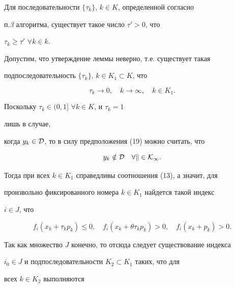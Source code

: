 \begin{lem}


Для последовательности $\{\tau_k\}$, $k\in K$, определенной согласно


п.{\em 3} алгоритма, существует такое число $\tau'>0$, что


$\tau_k\ge \tau'$ $\forall k\in k$.


\end{lem}





\begin{pf}


Допустим, что утверждение леммы неверно, т.е. существует такая


подпоследовательность $\{\tau_k\}$, $k\in K_1\subset K$, что


\begin{equation}


\tau_k\to 0,\quad k\to\infty,\quad k\in K_1.


\end{equation}


Поскольку $\tau_k\in(0,1]$ $\forall k\in K$, и $\tau_k=1$


лишь в случае,


когда $y_k\in\cal D$, то в силу предположения (19) можно считать, что


\begin{equation}


y_k\notin\cal D\quad \forall k\in K_1.


\end{equation}


Тогда при всех $k\in K_1$ справедливы соотношения (13), а значит, для


произвольно фиксированного номера $k\in K_1$ найдется такой индекс


$i\in J$, что


\begin{equation}


f_i(x_k+\tau_kp_k)\le 0,\quad


f_i(x_k+\theta\tau_kp_k)>0,\quad f_i(x_k+p_k)>0.


\end{equation}


Так как множество $J$ конечно, то отсюда следует существование индекса


$i_0\in J$ и подпоследовательности $K_2\subset K_1$ таких, что для


всех $k\in K_2$ выполняются



\end{pf}
